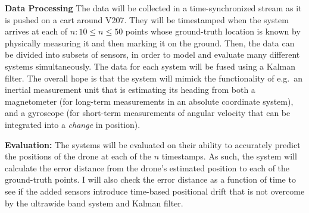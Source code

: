 \textbf{Data Processing}
The data will be collected in a time-synchronized stream as it is pushed on a cart around V207.
They will be timestamped when the system arrives at each of $n: 10 \leq n \leq 50$ points
whose ground-truth location is known by physically measuring it and then marking it on the ground.
Then, the data can be divided into subsets of sensors, in order to model and evaluate many different
systems simultaneously.
The data for each system will be fused using a Kalman filter.
The overall hope is that the system will mimick the functionality of
e.g.~an inertial measurement unit that is estimating its heading
from both a magnetometer (for long-term measurements in an absolute coordinate system),
and a gyroscope (for short-term measurements of angular velocity that can be integrated into a \emph{change} in position).

\textbf{Evaluation:}
The systems will be evaluated on their ability to accurately predict the positions of the drone
at each of the $n$ timestamps.
As such, the system will calculate the error distance from the drone's estimated position to each of the
ground-truth points.
I will also check the error distance as a function of time to see if the added sensors introduce
time-based positional drift that is not overcome by the ultrawide band system and Kalman filter.


